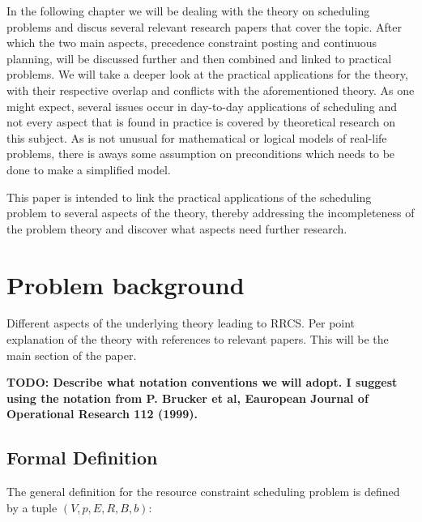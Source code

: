 \documentclass{article}
\newcommand{\TODO}[1]{{\color{red}\textbf{TODO: #1}}}
\begin{document}
In the following chapter we will be dealing with the theory on scheduling problems and discus several relevant research papers that cover the topic.
After which the two main aspects, precedence constraint posting and continuous planning, will be discussed further and then combined and linked to practical problems.
We will take a deeper look at the practical applications for the theory, with their respective overlap and conflicts with the aforementioned theory.
As one might expect, several issues occur in day-to-day applications of scheduling and not every aspect that is found in practice is covered by theoretical research on this subject.
As is not unusual for mathematical or logical models of real-life problems, there is aways some assumption on preconditions which needs to be done to make a simplified model.

This paper is intended to link the practical applications of the scheduling problem to several aspects of the theory, thereby addressing the incompleteness of the problem theory and discover what aspects need further research.


\newpage

\section{Problem background}

Different aspects of the underlying theory leading to RRCS.  Per point explanation of the theory with references to relevant papers. This will be the main section of the paper.

\TODO{Describe what notation conventions we will adopt. I suggest using the notation from P. Brucker et al, Eauropean Journal of Operational Research 112 (1999). }

\subsection{Formal Definition}
The general definition for the resource constraint scheduling problem is defined by a tuple $(V, p, E,R,B, b)$: \cite{brucker99}
\end{document}
